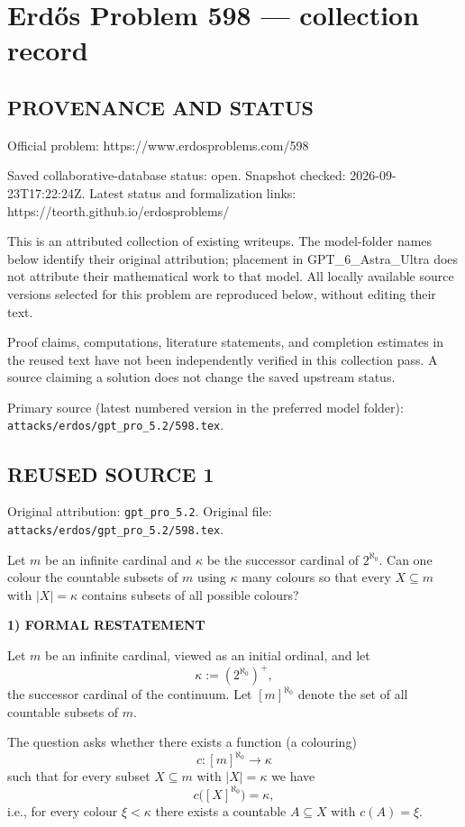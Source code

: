 \section*{Erd\H{o}s Problem 598 --- collection record}

\subsection*{PROVENANCE AND STATUS}
Official problem: https://www.erdosproblems.com/598

Saved collaborative-database status: open.
Snapshot checked: 2026-09-23T17:22:24Z.
Latest status and formalization links: https://teorth.github.io/erdosproblems/

This is an attributed collection of existing writeups. The model-folder names below identify their original attribution; placement in GPT\_6\_Astra\_Ultra does not attribute their mathematical work to that model. All locally available source versions selected for this problem are reproduced below, without editing their text.

Proof claims, computations, literature statements, and completion estimates in the reused text have not been independently verified in this collection pass. A source claiming a solution does not change the saved upstream status.

Primary source (latest numbered version in the preferred model folder): \texttt{attacks/erdos/gpt\_pro\_5.2/598.tex}.

\subsection*{REUSED SOURCE 1}
Original attribution: \texttt{gpt\_pro\_5.2}.
Original file: \texttt{attacks/erdos/gpt\_pro\_5.2/598.tex}.


Let $m$ be an infinite cardinal and $\kappa$ be the successor cardinal of $2^{\aleph_0}$. Can one colour the countable subsets of $m$ using $\kappa$ many colours so that every $X\subseteq m$ with $\lvert X\rvert=\kappa$ contains subsets of all possible colours?

\noindent\textbf{1) FORMAL RESTATEMENT}\par
Let $m$ be an infinite cardinal, viewed as an initial ordinal, and let
\[
\kappa := (2^{\aleph_0})^+,
\]
the successor cardinal of the continuum.
Let $[m]^{\aleph_0}$ denote the set of all countable subsets of $m$.

The question asks whether there exists a function (a colouring)
\[
c : [m]^{\aleph_0} \to \kappa
\]
such that for every subset $X\subseteq m$ with $|X|=\kappa$ we have
\[
 c\big([X]^{\aleph_0}\big) = \kappa,
\]
i.e., for every colour $\xi<\kappa$ there exists a countable $A\subseteq X$ with $c(A)=\xi$.

